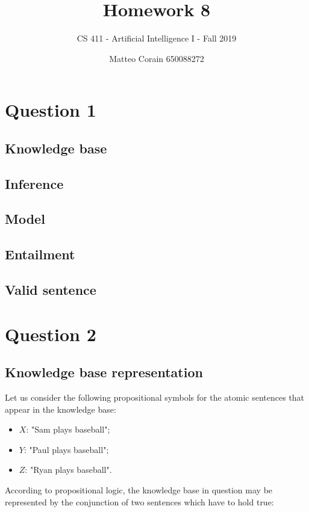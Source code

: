 \documentclass[letterpaper,headings=standardclasses]{scrartcl}
\title{Homework 8}
\subtitle{CS 411 - Artificial Intelligence I - Fall 2019}
\author{Matteo Corain 650088272}
\begin{document}
\maketitle

\section{Question 1}

\subsection{Knowledge base}

\subsection{Inference}

\subsection{Model}

\subsection{Entailment}

\subsection{Valid sentence}

\section{Question 2}

\subsection{Knowledge base representation}

Let us consider the following propositional symbols for the atomic sentences that appear in the knowledge base:

\begin{itemize}
    \item $X$: "Sam plays baseball";
    \item $Y$: "Paul plays baseball";
    \item $Z$: "Ryan plays baseball".
\end{itemize}

According to propositional logic, the knowledge base in question may be represented by the conjunction of two sentences which have to hold true:
\end{document}

